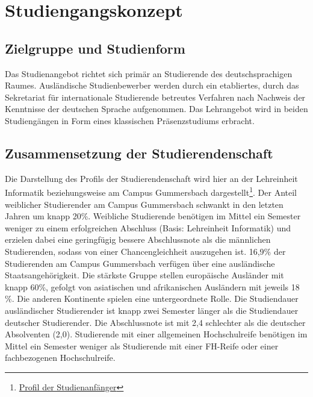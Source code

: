 \chapter{Studiengangskonzept\label{/mi-2017/selbstbericht/0400-studiengangskonzept/0000-studiengangskonzept}}\label{studiengangskonzeptpathlabelmi-2017selbstbericht0400-studiengangskonzept0000-studiengangskonzept}

\section{Zielgruppe und
Studienform\label{/mi-2017/selbstbericht/0400-studiengangskonzept/0000-studiengangskonzept}}\label{zielgruppe-und-studienformpathlabelmi-2017selbstbericht0400-studiengangskonzept0000-studiengangskonzept}

Das Studienangebot richtet sich primär an Studierende des
deutschsprachigen Raumes. Ausländische Studienbewerber werden durch ein
etabliertes, durch das Sekretariat für internationale Studierende
betreutes Verfahren nach Nachweis der Kenntnisse der deutschen Sprache
aufgenommen. Das Lehrangebot wird in beiden Studiengängen in Form eines
klassischen Präsenzstudiums erbracht.

\section{Zusammensetzung der
Studierendenschaft\label{/mi-2017/selbstbericht/0400-studiengangskonzept/0000-studiengangskonzept}}\label{zusammensetzung-der-studierendenschaftpathlabelmi-2017selbstbericht0400-studiengangskonzept0000-studiengangskonzept}

Die Darstellung des Profils der Studierendenschaft wird hier an der
Lehreinheit Informatik beziehungsweise am Campus Gummersbach
dargestellt\footnote{\href{https://th-koeln.github.io/mi-2017/anhaenge/stat-profil-studienanfaenger-2017.pdf}{Profil
  der Studienanfänger}}. Der Anteil weiblicher Studierender am Campus
Gummersbach schwankt in den letzten Jahren um knapp 20\%. Weibliche
Studierende benötigen im Mittel ein Semester weniger zu einem
erfolgreichen Abschluss (Basis: Lehreinheit Informatik) und erzielen
dabei eine geringfügig bessere Abschlussnote als die männlichen
Studierenden, sodass von einer Chancengleichheit auszugehen ist. 16,9\%
der Studierenden am Campus Gummersbach verfügen über eine ausländische
Staatsangehörigkeit. Die stärkste Gruppe stellen europäische Ausländer
mit knapp 60\%, gefolgt von asiatischen und afrikanischen Ausländern mit
jeweils 18 \%. Die anderen Kontinente spielen eine untergeordnete Rolle.
Die Studiendauer ausländischer Studierender ist knapp zwei Semester
länger als die Studiendauer deutscher Studierender. Die Abschlussnote
ist mit 2,4 schlechter als die deutscher Absolventen (2,0). Studierende
mit einer allgemeinen Hochschulreife benötigen im Mittel ein Semester
weniger als Studierende mit einer FH-Reife oder einer fachbezogenen
Hochschulreife.

